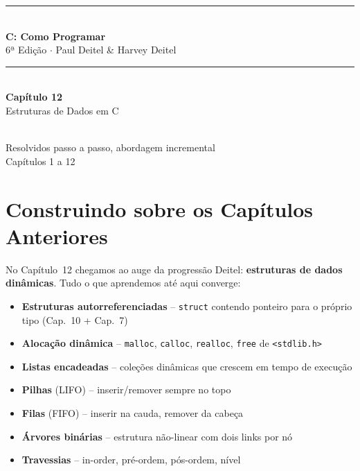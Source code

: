 \documentclass[12pt,a4paper]{article}
\begin{document}
\begin{titlepage}
  \centering\vspace*{2cm}
  {\color{deitelblue}\rule{\linewidth}{2pt}}\\[0.4cm]
  {\huge\bfseries\color{deitelblue}C: Como Programar}\\[0.2cm]
  {\large\color{deitelblue}6ª Edição $\cdot$ Paul Deitel \& Harvey Deitel}\\[0.2cm]
  {\color{deitelblue}\rule{\linewidth}{2pt}}\\[1cm]
  {\LARGE\bfseries Capítulo 12}\\[0.3cm]
  {\Large\color{deitelblue!80}Estruturas de Dados em C}\\[0.8cm]
  \begin{tcolorbox}[colback=deitellightblue,colframe=deitelblue,width=0.85\linewidth]
    \\[0.2cm]
    {\normalsize Resolvidos passo a passo, abordagem incremental\\
    Capítulos 1 a 12}
  \end{tcolorbox}
\end{titlepage}

\section*{Construindo sobre os Capítulos Anteriores}

No Capítulo~12 chegamos ao auge da progressão Deitel: \textbf{estruturas de dados
dinâmicas}. Tudo o que aprendemos até aqui converge:

\begin{itemize}[noitemsep]
  \item \textbf{Estruturas autorreferenciadas} -- \texttt{struct} contendo
  ponteiro para o próprio tipo (Cap.~10 + Cap.~7)
  \item \textbf{Alocação dinâmica} -- \texttt{malloc}, \texttt{calloc},
  \texttt{realloc}, \texttt{free} de \texttt{<stdlib.h>}
  \item \textbf{Listas encadeadas} -- coleções dinâmicas que crescem em tempo
  de execução
  \item \textbf{Pilhas} (LIFO) -- inserir/remover sempre no topo
  \item \textbf{Filas} (FIFO) -- inserir na cauda, remover da cabeça
  \item \textbf{Árvores binárias} -- estrutura não-linear com dois links por nó
  \item \textbf{Travessias} -- in-order, pré-ordem, pós-ordem, nível
\end{itemize}
\end{document}
